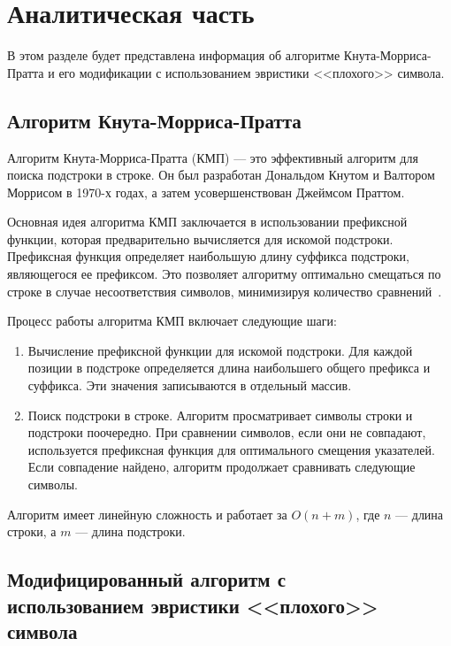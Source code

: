 \chapter{Аналитическая часть}
В этом разделе будет представлена информация об алгоритме Кнута-Морриса-Пратта и его модификации с использованием эвристики <<плохого>> символа.

\section{Алгоритм Кнута-Морриса-Пратта}

Алгоритм Кнута-Морриса-Пратта (КМП) --- это эффективный алгоритм для поиска подстроки в строке. 
Он был разработан Дональдом Кнутом и Валтором Моррисом в 1970-х годах, а затем усовершенствован Джеймсом Праттом.

Основная идея алгоритма КМП заключается в использовании префиксной функции, которая предварительно вычисляется для искомой подстроки. 
Префиксная функция определяет наибольшую длину суффикса подстроки, являющегося ее префиксом. 
Это позволяет алгоритму оптимально смещаться по строке в случае несоответствия символов, минимизируя количество сравнений~\cite{analyt}.

Процесс работы алгоритма КМП включает следующие шаги:
\begin{enumerate}[label=\arabic*)]
	\item Вычисление префиксной функции для искомой подстроки.
	Для каждой позиции в подстроке определяется длина наибольшего общего префикса и суффикса. Эти значения записываются в отдельный массив.
	\item Поиск подстроки в строке.
	Алгоритм просматривает символы строки и подстроки поочередно. 
	При сравнении символов, если они не совпадают, используется префиксная функция для оптимального смещения указателей. 
	Если совпадение найдено, алгоритм продолжает сравнивать следующие символы.
\end{enumerate}

Алгоритм имеет линейную сложность и работает за $O(n + m)$, где $n$ --- длина строки, а $m$ --- длина подстроки.

\section[Модифицированный алгоритм с использованием эвристики <<плохого>> символа]{Модифицированный алгоритм с \\использованием эвристики <<плохого>> \\символа}


